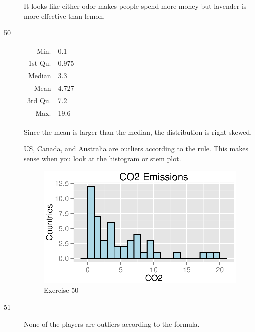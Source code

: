 \documentclass{exam}
\begin{document}
\begin{description}
        It looks like either odor makes people spend more money but lavender is
        more effective than lemon.

      \item[50]
        \begin{table}[H]
          \centering
          \begin{tabular}{rl}
            \toprule
            Min.    & 0.1 \\
            1st Qu. & 0.975 \\
            Median  & 3.3 \\
            Mean    & 4.727 \\
            3rd Qu. & 7.2 \\
            Max.    & 19.6 \\
            \bottomrule
          \end{tabular}
        \end{table}

        Since the mean is larger than the median, the distribution is right-skewed.

        US, Canada, and Australia are outliers according to the rule.  This
        makes sense when you look at the histogram or stem plot.

        \begin{figure}[H]
          \centering
          \includegraphics{figures/ex50.eps}
          \caption{Exercise 50}
        \end{figure}

      \item[51] None of the players are outliers according to the formula.

    \end{description}
\end{document}
